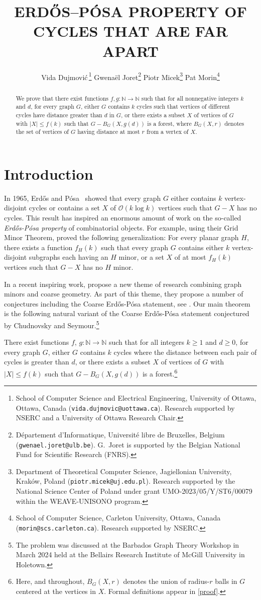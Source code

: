 \documentclass{patmorin}
\title{\MakeUppercase{{E}rdős–{P}ósa property of cycles that are far apart}}
\author{%
 Vida Dujmovi{\'c}\,\thanks{School of Computer Science and Electrical Engineering, University of Ottawa, Ottawa, Canada (\texttt{vida.dujmovic@uottawa.ca}). Research supported by NSERC and a University of Ottawa Research Chair.}
 \qquad
 Gwena\"el Joret\thanks{D\'epartement d'Informatique, Universit\'e libre de Bruxelles, Belgium ({\tt gwenael.joret@ulb.be}). G.\ Joret is supported by the Belgian National Fund for Scientific Research (FNRS).}
 \qquad
 Piotr Micek\thanks{Department of Theoretical Computer Science, Jagiellonian University, Kraków, Poland (\texttt{piotr.micek@uj.edu.pl}). Research supported by the National Science Center of Poland under grant UMO-2023/05/Y/ST6/00079 within the WEAVE-UNISONO program.}
 \qquad
 Pat Morin\thanks{School of Computer Science, Carleton University, Ottawa, Canada (\texttt{morin@scs.carleton.ca}). Research supported by NSERC.}%
}
\date{}
\newcommand{\Oh}{\mathcal{O}}
\begin{document}
\maketitle


\begin{abstract}
  We prove that there exist functions  $f,g:\mathbb{N}\to\mathbb{N}$ such that for all nonnegative integers $k$ and $d$,  for every graph $G$,  either $G$ contains $k$ cycles such that vertices of different cycles have distance greater than $d$ in $G$, or there exists a subset $X$ of vertices of $G$ with $|X|\leq f(k)$ such that  $G-B_G(X,g(d))$ is a forest, where $B_G(X,r)$ denotes the set of vertices of $G$ having distance at most $r$ from a vertex of $X$.
\end{abstract}


\section{Introduction}

In 1965, Erdős and Pósa~\cite{EP1965} showed that every graph $G$ either contains $k$ vertex-disjoint cycles or contains a set $X$ of $\Oh(k\log k)$ vertices such that $G-X$ has no cycles. This result has inspired an enormous amount of work on the so-called \emph{Erdős-Pósa property} of combinatorial objects. For example, using their Grid Minor Theorem, \citet{RS1986} proved the following generalization: For every planar graph $H$, there exists a function $f_H(k)$ such that every graph $G$ contains either $k$ vertex-disjoint subgraphs each having an $H$ minor, or a set $X$ of at most $f_H(k)$ vertices such that $G-X$ has no $H$ minor.

In a recent inspiring work, \citet{GP23} propose a new theme of research combining graph minors and coarse geometry. As part of this theme, they propose a number of conjectures including the Coarse Erdős-Pósa statement, see \cite[Conjecture 9.7]{GP23}. Our main theorem is the following natural variant of the Coarse Erdős-Pósa statement conjectured by Chudnovsky and Seymour.\footnote{The problem was discussed at the Barbados Graph Theory Workshop in March 2024 held at the Bellairs Research Institute of McGill University in Holetown.}

\begin{thm}\label{thm:main-in-intro}
  There exist functions $f,\, g:\mathbb{N}\to\mathbb{N}$ such that for all integers $k\ge 1$ and $d\ge 0$, for every graph $G$,  either $G$ contains $k$ cycles where the distance between each pair of cycles is greater than $d$, or  there exists a subset $X$ of vertices of $G$ with $|X|\leq f(k)$ such that  $G-B_G(X,g(d))$ is a forest.\footnote{Here, and throughout, $B_G(X,r)$ denotes the union of radius-$r$ balls in $G$ centered at the vertices in $X$.  Formal definitions appear in \cref{proof}.}
\end{thm}
\end{document}
